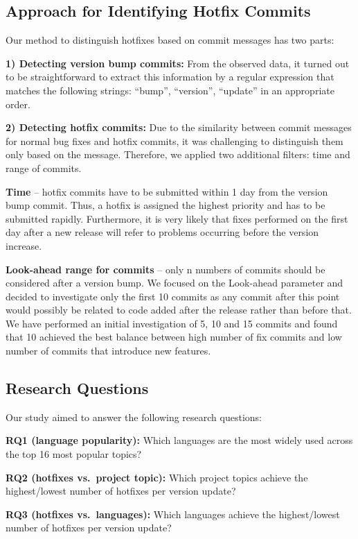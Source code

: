 \documentclass{sig-alternate}
\begin{document}
\subsection{Approach for Identifying Hotfix Commits}
Our method to distinguish hotfixes based on commit messages has two parts:

\textbf{1) Detecting version bump commits:} From the observed data, it turned out to be straightforward to extract this information by a regular expression that matches the following strings: ``bump'', ``version'', ``update'' in an appropriate order.

\textbf{2) Detecting hotfix commits:} Due to the similarity between commit messages for normal bug fixes and hotfix commits, it was challenging to distinguish them only based on the message. Therefore, we applied two additional filters: time and range of commits.

\textbf{Time} -- hotfix commits have to be submitted within 1 day from the version bump commit. Thus, a hotfix is assigned the highest priority and has to be submitted rapidly. Furthermore, it is very likely that fixes performed on the first day after a new release will refer to problems occurring before the version increase.

\textbf{Look-ahead range for commits} -- only n numbers of commits should be considered after a version bump. We focused on the Look-ahead parameter and decided to investigate only the first 10 commits as any commit after this point would possibly be related to code added after the release rather than before that. We have performed an initial investigation of 5, 10 and 15 commits and found that 10 achieved the best balance between high number of fix commits and low number of commits that introduce new features.

\subsection{Research Questions}
\noindent Our study aimed to answer the following research questions:

\noindent\textbf{RQ1 (language popularity):} Which languages are the most widely used across the top 16 most popular topics?

\noindent\textbf{RQ2 (hotfixes vs.\ project topic):} Which project topics achieve the highest/lowest number of hotfixes per version update?

\noindent\textbf{RQ3 (hotfixes vs.\ languages):} Which languages achieve the highest/lowest number of hotfixes per version update?
\end{document}
